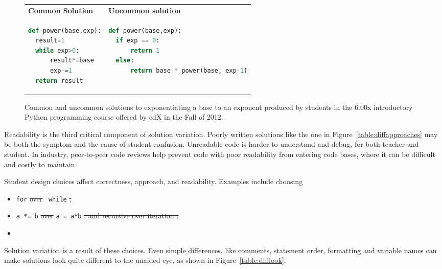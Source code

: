 \documentclass[12pt,twoside]{mitthesis}
\providecommand{\DIFaddtex}[1]{{\protect\color{blue}\uwave{#1}}} %
\providecommand{\DIFdeltex}[1]{{\protect\color{red}\sout{#1}}}                      %
\providecommand{\DIFaddbegin}{} %
\providecommand{\DIFaddend}{} %
\providecommand{\DIFdelbegin}{} %
\providecommand{\DIFdelend}{} %
\providecommand{\DIFadd}[1]{\texorpdfstring{\DIFaddtex{#1}}{#1}} %
\providecommand{\DIFdel}[1]{\texorpdfstring{\DIFdeltex{#1}}{}} %
\begin{document}
\begin{figure}
\begin{tabular}{ll}
{\bf Common Solution} & {\bf Uncommon solution} \\
\begin{minipage}{0.5\linewidth}
\begin{lstlisting}[basicstyle=\linespread{1.0}\ttfamily\footnotesize,language=python]
def power(base,exp):
  result=1
  while exp>0:
      result*=base
      exp-=1
  return result
\end{lstlisting}
\end{minipage}
& 

\begin{minipage}{1.0\linewidth}
\begin{lstlisting}[basicstyle=\linespread{1.0}\ttfamily\footnotesize,language=python]
def power(base,exp):
  if exp == 0:
      return 1
  else:
      return base * power(base, exp-1)
\end{lstlisting}
\end{minipage} 
\end{tabular}
\caption{Common and uncommon solutions to exponentiating a base to an exponent produced by students in the 6.00x introductory Python programming course offered by edX in the Fall of 2012.}
\label{table:commonuncommon}
\end{figure}

Readability is the third critical component of solution variation. Poorly written solutions like the one in Figure~\ref{table:diffapproaches} may be both the symptom and the cause of student confusion. Unreadable code is harder to understand and debug, for both teacher and student. In industry, peer-to-peer code reviews help prevent code with poor readability from entering code bases, where it can be difficult and costly to maintain.

\DIFdelbegin %
\DIFdelend Student design choices \DIFdelbegin %
\DIFdelend affect correctness, approach, and readability. Examples include choosing\DIFaddbegin \DIFadd{:
} \begin{itemize}  
\item \DIFaddend \texttt{for} \DIFdelbegin \DIFdel{over }\DIFdelend \DIFaddbegin \DIFadd{or }\DIFaddend ~\texttt{while}
\DIFdelbegin \DIFdel{, }\DIFdelend \DIFaddbegin \item \DIFaddend \texttt{a *= b} \DIFdelbegin \DIFdel{over }\DIFdelend \DIFaddbegin \DIFadd{or }\DIFaddend \texttt{a = a*b}
\DIFdelbegin \DIFdel{, and recursive over iteration 
. }\DIFdelend \DIFaddbegin \item \DIFadd{recursive or iteration 
} \end{itemize} 
\DIFaddend Solution variation is a result of these choices. Even simple differences, like comments, statement order, formatting and variable names can make solutions look quite different to the unaided eye, as shown in Figure~\ref{table:difflook}.
\end{document}
